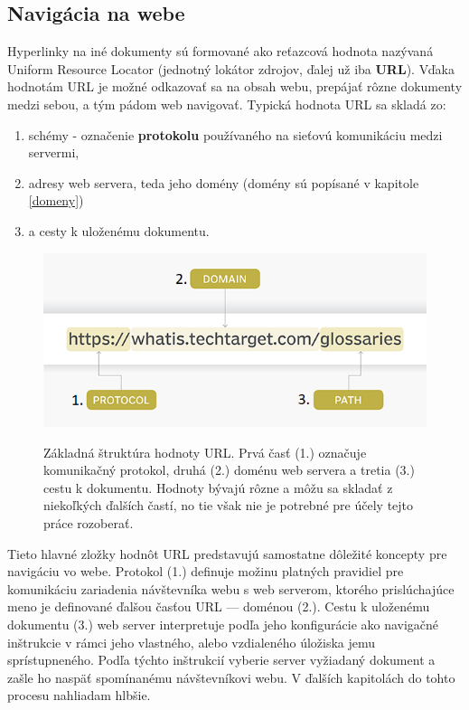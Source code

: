 
\pagebreak

\subsection{Navigácia na webe}
\label{navigacia-na-webe}

Hyperlinky na iné dokumenty sú formované ako reťazcová hodnota nazývaná Uniform Resource Locator (jednotný lokátor zdrojov, ďalej už iba \textbf{URL}).
Vďaka hodnotám URL je možné odkazovať sa na obsah webu, prepájať rôzne dokumenty medzi sebou, a tým pádom web navigovať.
Typická hodnota URL sa skladá zo:
\begin{enumerate}
    \item schémy - označenie \textbf{protokolu} používaného na sieťovú komunikáciu medzi servermi,
    \item adresy web servera, teda jeho domény (domény sú popísané v kapitole \ref{domeny})
    \item a cesty k uloženému dokumentu.
\end{enumerate}

\begin{figure}[htb]
\begin{center}
 \includegraphics[scale=0.52]{obrazky-figures/the-anatomy-of-a-url.png}\label{fig:figure1}
 \caption{\centering Základná štruktúra hodnoty URL. Prvá časť (1.) označuje komunikačný protokol, druhá (2.) doménu web servera a tretia (3.) cestu k dokumentu. Hodnoty bývajú rôzne a môžu sa skladať z niekoľkých ďalších častí, no tie však nie je potrebné pre účely tejto práce rozoberať.}
 \label{img:urlstructure}
\end{center}
\end{figure}

\pagebreak

Tieto hlavné zložky hodnôt URL predstavujú samostatne dôležité koncepty pre navigáciu vo webe.
Protokol (1.) definuje možinu platných pravidiel pre komunikáciu zariadenia návštevníka webu s web 
serverom, ktorého prislúchajúce meno je definované ďalšou časťou URL --- doménou (2.). 
Cestu k uloženému dokumentu (3.) web server interpretuje podľa jeho konfigurácie ako navigačné inštrukcie 
v rámci jeho vlastného, alebo vzdialeného úložiska jemu sprístupneného. 
Podľa týchto inštrukcií vyberie server vyžiadaný dokument a zašle ho naspäť spomínanému návštevníkovi webu.
V ďalších kapitolách do tohto procesu nahliadam hlbšie.

